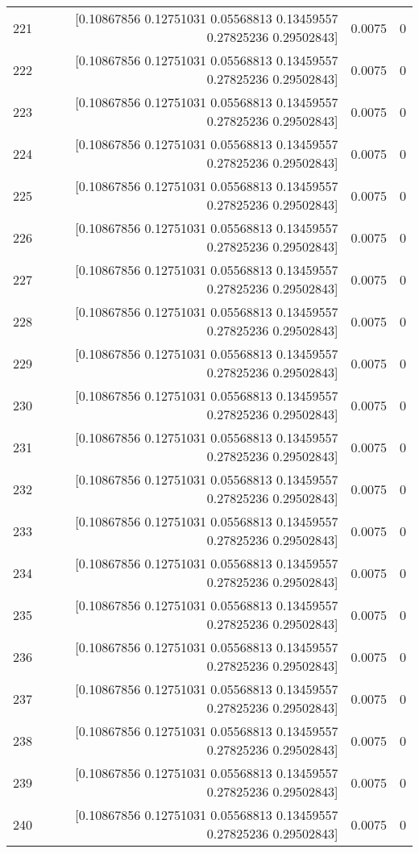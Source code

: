 \begin{longtable}{lrrr}
221 & [0.10867856 0.12751031 0.05568813 0.13459557 0.27825236 0.29502843] & 0.0075 & 0 \\
222 & [0.10867856 0.12751031 0.05568813 0.13459557 0.27825236 0.29502843] & 0.0075 & 0 \\
223 & [0.10867856 0.12751031 0.05568813 0.13459557 0.27825236 0.29502843] & 0.0075 & 0 \\
224 & [0.10867856 0.12751031 0.05568813 0.13459557 0.27825236 0.29502843] & 0.0075 & 0 \\
225 & [0.10867856 0.12751031 0.05568813 0.13459557 0.27825236 0.29502843] & 0.0075 & 0 \\
226 & [0.10867856 0.12751031 0.05568813 0.13459557 0.27825236 0.29502843] & 0.0075 & 0 \\
227 & [0.10867856 0.12751031 0.05568813 0.13459557 0.27825236 0.29502843] & 0.0075 & 0 \\
228 & [0.10867856 0.12751031 0.05568813 0.13459557 0.27825236 0.29502843] & 0.0075 & 0 \\
229 & [0.10867856 0.12751031 0.05568813 0.13459557 0.27825236 0.29502843] & 0.0075 & 0 \\
230 & [0.10867856 0.12751031 0.05568813 0.13459557 0.27825236 0.29502843] & 0.0075 & 0 \\
231 & [0.10867856 0.12751031 0.05568813 0.13459557 0.27825236 0.29502843] & 0.0075 & 0 \\
232 & [0.10867856 0.12751031 0.05568813 0.13459557 0.27825236 0.29502843] & 0.0075 & 0 \\
233 & [0.10867856 0.12751031 0.05568813 0.13459557 0.27825236 0.29502843] & 0.0075 & 0 \\
234 & [0.10867856 0.12751031 0.05568813 0.13459557 0.27825236 0.29502843] & 0.0075 & 0 \\
235 & [0.10867856 0.12751031 0.05568813 0.13459557 0.27825236 0.29502843] & 0.0075 & 0 \\
236 & [0.10867856 0.12751031 0.05568813 0.13459557 0.27825236 0.29502843] & 0.0075 & 0 \\
237 & [0.10867856 0.12751031 0.05568813 0.13459557 0.27825236 0.29502843] & 0.0075 & 0 \\
238 & [0.10867856 0.12751031 0.05568813 0.13459557 0.27825236 0.29502843] & 0.0075 & 0 \\
239 & [0.10867856 0.12751031 0.05568813 0.13459557 0.27825236 0.29502843] & 0.0075 & 0 \\
240 & [0.10867856 0.12751031 0.05568813 0.13459557 0.27825236 0.29502843] & 0.0075 & 0 \\

\end{longtable}
